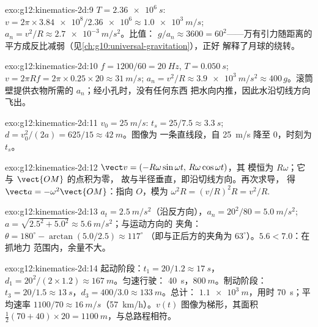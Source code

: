 \begin{solution}{exo:g12:kinematics-2d:9}
$T = \qty{2.36e6}{s}$: $v = 2\pi \times \num{3.84e8}/\num{2.36e6}
\approx \qty{1.0e3}{m/s}$;
$a_n = v^2/R \approx \qty{2.7e-3}{m/s^2}$。比值：
$g/a_n \approx 3600 = 60^2$——万有引力随距离的
平方成反比减弱（见\cref{ch:g10:universal-gravitation}），正好
解释了月球的绕转。
\end{solution}

\begin{solution}{exo:g12:kinematics-2d:10}
$f = 1200/60 = \qty{20}{Hz}$, $T = \qty{0.050}{s}$;
$v = 2\pi R f = 2\pi \times 0.25 \times 20 \approx \qty{31}{m/s}$;
$a_n = v^2/R \approx \qty{3.9e3}{m/s^2} \approx 400\,g$。滚筒
壁提供衣物所需的 $a_n$；经小孔时，没有任何东西
把水向内推，因此水沿切线方向飞出。
\end{solution}

\begin{solution}{exo:g12:kinematics-2d:11}
$v_0 = \qty{25}{m/s}$: $t_s = 25/7.5 \approx \qty{3.3}{s}$;
$d = v_0^2/(2a) = 625/15 \approx \qty{42}{m}$。图像为
一条直线段，自 \qty{25}{m/s} 降至 $0$，时刻为 $t_s$。
\end{solution}

\begin{solution}{exo:g12:kinematics-2d:12}
$\vect v = (-R\omega\sin\omega t,\, R\omega\cos\omega t)$，其
模恒为 $R\omega$；它与 $\vect{OM}$ 的点积为零，
故与半径垂直，即沿切线方向。再次求导，
得 $\vect a = -\omega^2\vect{OM}$：指向 $O$，模为
$\omega^2 R = (v/R)^2 R = v^2/R$.
\end{solution}

\begin{solution}{exo:g12:kinematics-2d:13}
$a_t = \qty{2.5}{m/s^2}$（沿反方向），$a_n = 20^2/80 =
\qty{5.0}{m/s^2}$;
$a = \sqrt{2.5^2 + 5.0^2} \approx \qty{5.6}{m/s^2}$；与运动方向的
夹角：$\theta = 180^\circ - \arctan(5.0/2.5) \approx 117^\circ$
（即与正后方的夹角为 $63^\circ$）。$5.6 < 7.0$：在抓地力
范围内，余量不大。
\end{solution}

\begin{solution}{exo:g12:kinematics-2d:14}
起动阶段：$t_1 = 20/1.2 \approx \qty{17}{s}$，
$d_1 = 20^2/(2 \times 1.2) \approx \qty{167}{m}$。匀速行驶：
\qty{40}{s}，$\qty{800}{m}$。制动阶段：$t_3 = 20/1.5 \approx
\qty{13}{s}$，$d_3 = 400/3.0 \approx \qty{133}{m}$。总计：
$\qty{1.1e3}{m}$，用时 \qty{70}{s}；平均速率 $1100/70 \approx
\qty{16}{m/s}$（\qty{57}{km/h}）。$v(t)$ 图像为梯形，其面积
$\tfrac12(70 + 40) \times 20 = \qty{1100}{m}$，与总路程相符。
\end{solution}


